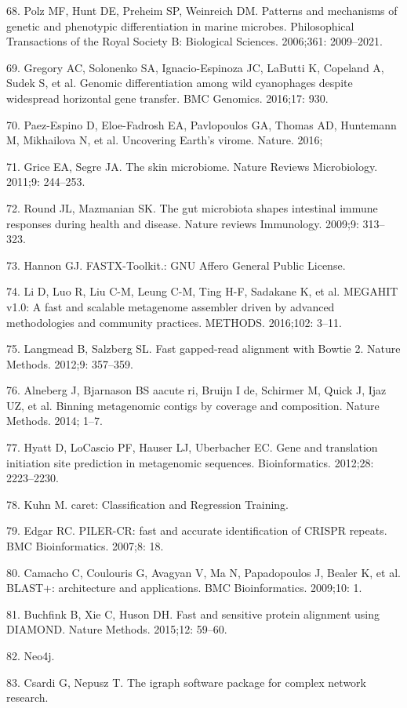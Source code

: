 \documentclass[12pt,]{article}
\begin{document}
\hypertarget{ref-Polz:2006fi}{}
68. Polz MF, Hunt DE, Preheim SP, Weinreich DM. Patterns and mechanisms
of genetic and phenotypic differentiation in marine microbes.
Philosophical Transactions of the Royal Society B: Biological Sciences.
2006;361: 2009--2021.

\hypertarget{ref-Gregory:2016cg}{}
69. Gregory AC, Solonenko SA, Ignacio-Espinoza JC, LaButti K, Copeland
A, Sudek S, et al. Genomic differentiation among wild cyanophages
despite widespread horizontal gene transfer. BMC Genomics. 2016;17: 930.

\hypertarget{ref-PaezEspino:2016gi}{}
70. Paez-Espino D, Eloe-Fadrosh EA, Pavlopoulos GA, Thomas AD, Huntemann
M, Mikhailova N, et al. Uncovering Earth's virome. Nature. 2016;

\hypertarget{ref-Grice:2011gy}{}
71. Grice EA, Segre JA. The skin microbiome. Nature Reviews
Microbiology. 2011;9: 244--253.

\hypertarget{ref-Round:2009bz}{}
72. Round JL, Mazmanian SK. The gut microbiota shapes intestinal immune
responses during health and disease. Nature reviews Immunology. 2009;9:
313--323.

\hypertarget{ref-FASTXToolkit:wr}{}
73. Hannon GJ. FASTX-Toolkit.: GNU Affero General Public License.

\hypertarget{ref-Li:2016kd}{}
74. Li D, Luo R, Liu C-M, Leung C-M, Ting H-F, Sadakane K, et al.
MEGAHIT v1.0: A fast and scalable metagenome assembler driven by
advanced methodologies and community practices. METHODS. 2016;102:
3--11.

\hypertarget{ref-Langmead:2012jh}{}
75. Langmead B, Salzberg SL. Fast gapped-read alignment with Bowtie 2.
Nature Methods. 2012;9: 357--359.

\hypertarget{ref-Alneberg:2014fc}{}
76. Alneberg J, Bjarnason BS aacute ri, Bruijn I de, Schirmer M, Quick
J, Ijaz UZ, et al. Binning metagenomic contigs by coverage and
composition. Nature Methods. 2014; 1--7.

\hypertarget{ref-Hyatt:2012cy}{}
77. Hyatt D, LoCascio PF, Hauser LJ, Uberbacher EC. Gene and translation
initiation site prediction in metagenomic sequences. Bioinformatics.
2012;28: 2223--2230.

\hypertarget{ref-caretClassificatio:ux5fU2Litux5f1}{}
78. Kuhn M. caret: Classification and Regression Training.

\hypertarget{ref-Edgar:2007bh}{}
79. Edgar RC. PILER-CR: fast and accurate identification of CRISPR
repeats. BMC Bioinformatics. 2007;8: 18.

\hypertarget{ref-Camacho:2009fc}{}
80. Camacho C, Coulouris G, Avagyan V, Ma N, Papadopoulos J, Bealer K,
et al. BLAST+: architecture and applications. BMC Bioinformatics.
2009;10: 1.

\hypertarget{ref-Buchfink:2015ki}{}
81. Buchfink B, Xie C, Huson DH. Fast and sensitive protein alignment
using DIAMOND. Nature Methods. 2015;12: 59--60.

\hypertarget{ref-Neoj:Fuwr6PBN}{}
82. Neo4j.

\hypertarget{ref-Theigraphsoftware:vh}{}
83. Csardi G, Nepusz T. The igraph software package for complex network
research.
\end{document}
